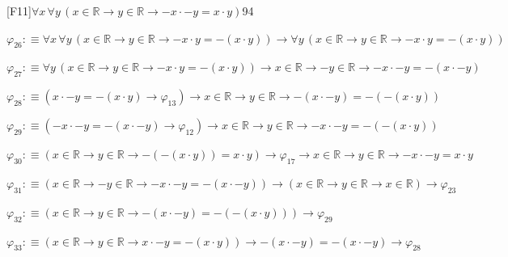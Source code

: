 \begin{fullproof}{[F11]}{$\forall x\,\forall y\,(x \in \mathbb{R} \to y \in \mathbb{R} \to -x \cdot -y = x \cdot y)$}{94}
\begin{abbrevlist}
\item $\varphi_{26} :\equiv \forall x\,\forall y\,(x \in \mathbb{R} \to y \in \mathbb{R} \to -x \cdot y = -(x \cdot y)) \to \forall y\,(x \in \mathbb{R} \to y \in \mathbb{R} \to -x \cdot y = -(x \cdot y))$
\item $\varphi_{27} :\equiv \forall y\,(x \in \mathbb{R} \to y \in \mathbb{R} \to -x \cdot y = -(x \cdot y)) \to x \in \mathbb{R} \to -y \in \mathbb{R} \to -x \cdot -y = -(x \cdot -y)$
\item $\varphi_{28} :\equiv (x \cdot -y = -(x \cdot y) \to \varphi_{13}) \to x \in \mathbb{R} \to y \in \mathbb{R} \to -(x \cdot -y) = -(-(x \cdot y))$
\item $\varphi_{29} :\equiv (-x \cdot -y = -(x \cdot -y) \to \varphi_{12}) \to x \in \mathbb{R} \to y \in \mathbb{R} \to -x \cdot -y = -(-(x \cdot y))$
\item $\varphi_{30} :\equiv (x \in \mathbb{R} \to y \in \mathbb{R} \to -(-(x \cdot y)) = x \cdot y) \to \varphi_{17} \to x \in \mathbb{R} \to y \in \mathbb{R} \to -x \cdot -y = x \cdot y$
\item $\varphi_{31} :\equiv (x \in \mathbb{R} \to -y \in \mathbb{R} \to -x \cdot -y = -(x \cdot -y)) \to (x \in \mathbb{R} \to y \in \mathbb{R} \to x \in \mathbb{R}) \to \varphi_{23}$
\item $\varphi_{32} :\equiv (x \in \mathbb{R} \to y \in \mathbb{R} \to -(x \cdot -y) = -(-(x \cdot y))) \to \varphi_{29}$
\item $\varphi_{33} :\equiv (x \in \mathbb{R} \to y \in \mathbb{R} \to x \cdot -y = -(x \cdot y)) \to -(x \cdot -y) = -(x \cdot -y) \to \varphi_{28}$
\end{abbrevlist}
\end{fullproof}
